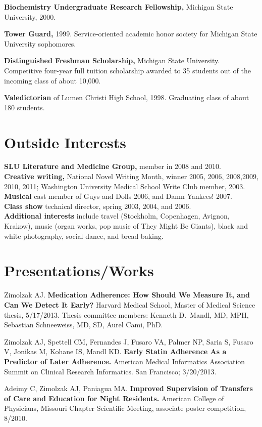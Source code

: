 \documentclass[12pt]{article}
\begin{document}
\textbf{Biochemistry Undergraduate Research Fellowship,} Michigan State
University, 2000.

\textbf{Tower Guard,} 1999. Service-oriented academic honor
society for Michigan State University sophomores.

\textbf{Distinguished Freshman Scholarship,} Michigan State
University. Competitive four-year full tuition scholarship awarded to
35 students out of the incoming class of about 10,000.

\textbf{Valedictorian} of Lumen Christi High School, 1998. Graduating
class of about 180 students.

\section{Outside Interests}

\textbf{SLU Literature and Medicine Group,} member in 2008 and 2010.\\
\textbf{Creative writing,} National Novel Writing Month, winner 2005, 2006,
2008,2009, 2010, 2011; Washington University Medical School Write Club
member, 2003.\\
\textbf{Musical} cast member of Guys and Dolls 2006, and Damn Yankees! 2007.\\
\textbf{Class show} technical director, spring 2003, 2004, and 2006.\\
\textbf{Additional interests} include travel (Stockholm, Copenhagen, Avignon,
Krakow), music (organ works, pop music of They Might Be Giants), black
and white photography, social dance, and bread baking.

\section{Presentations/Works}
Zimolzak AJ. \textbf{Medication Adherence: How Should We Measure It, and Can
We Detect It Early?} Harvard Medical School, Master of Medical Science
thesis, 5/17/2013. Thesis committee members: Kenneth D.\ Mandl, MD,
MPH, Sebastian Schneeweiss, MD, SD, Aurel Cami, PhD.

Zimolzak AJ, Spettell CM, Fernandes J, Fusaro VA, Palmer NP, Saria S,
Fusaro V, Jonikas M, Kohane IS, Mandl KD. \textbf{Early Statin
  Adherence As a Predictor of Later Adherence.} American Medical
Informatics Association Summit on Clinical Research Informatics. San
Francisco; 3/20/2013.

Adeimy C, Zimolzak AJ, Paniagua MA. \textbf{Improved Supervision of
  Transfers of Care and Education for Night Residents.} American
College of Physicians, Missouri Chapter Scientific Meeting, associate
poster competition, 8/2010.
\end{document}
